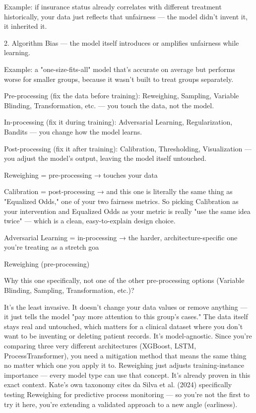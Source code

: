 \documentclass[authoryear,preprint,12pt]{elsarticle}
\begin{document}
Example: if insurance status already correlates with different treatment historically, your data just reflects that unfairness — the model didn't invent it, it inherited it.

2. Algorithm Bias — the model itself introduces or amplifies unfairness while learning.

Example: a "one-size-fits-all" model that's accurate on average but performs worse for smaller groups, because it wasn't built to treat groups separately.

Pre-processing (fix the data before training): Reweighing, Sampling, Variable Blinding, Transformation, etc. — you touch the data, not the model.

In-processing (fix it during training): Adversarial Learning, Regularization, Bandits — you change how the model learns.

Post-processing (fix it after training): Calibration, Thresholding, Visualization — you adjust the model's output, leaving the model itself untouched.


Reweighing = pre-processing → touches your data

Calibration = post-processing → and this one is literally the same thing as "Equalized Odds," one of your two fairness metrics. So picking Calibration as your intervention and Equalized Odds as your metric is really "use the same idea twice" — which is a clean, easy-to-explain design choice.

Adversarial Learning = in-processing → the harder, architecture-specific one you're treating as a stretch goa

Reweighing (pre-processing)

Why this one specifically, not one of the other pre-processing options (Variable Blinding, Sampling, Transformation, etc.)?

It's the least invasive. It doesn't change your data values or remove anything — it just tells the model "pay more attention to this group's cases." The data itself stays real and untouched, which matters for a clinical dataset where you don't want to be inventing or deleting patient records.
It's model-agnostic. Since you're comparing three very different architectures (XGBoost, LSTM, ProcessTransformer), you need a mitigation method that means the same thing no matter which one you apply it to. Reweighing just adjusts training-instance importance — every model type can use that concept.
It's already proven in this exact context. Kate's own taxonomy cites da Silva et al. (2024) specifically testing Reweighing for predictive process monitoring — so you're not the first to try it here, you're extending a validated approach to a new angle (earliness).
\end{document}
